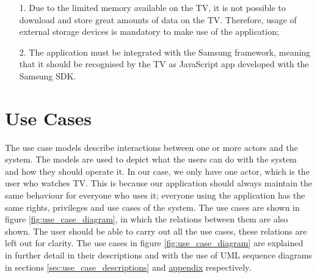 \begin{itemize}
\item[1.] Due to the limited memory available on the TV, it is not
possible to download and store great amounts of data on the TV.
Therefore, usage of external storage devices is mandatory to make use
of the application;

\item[2.] The application must be integrated with the Samsung
framework, meaning that it should be recognised by the TV as
JavaScript app developed with the Samsung SDK.
\end{itemize}

\section{Use Cases}
\label{sec:use_cases}
The use case models describe interactions between one or more actors and the system.
The models are used to depict what the users can do with the system and how they  should operate it.
In our case, we only have one actor, which is the user who watches TV. This is because our application should always
maintain the same behaviour for everyone who uses it; everyone using the application has the same rights, privileges
and use cases of the system. The use cases are shown in figure \ref{fig:use_case_diagram},
in which the relations between them are also shown. The user should be able to carry out all the use cases,
these relations are left out for clarity. The use cases in figure \ref{fig:use_case_diagram}
are explained in further detail in their descriptions and with the use of UML sequence diagrams in sections
\hyperref[sec:use_case_descriptions]{\ref*{sec:use_case_descriptions}} and
\hyperref[sec:req_dynamic_models]{appendix} respectively.


